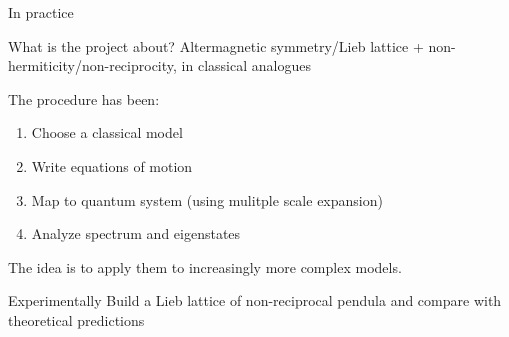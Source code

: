\documentclass[usepdftitle=false]{beamer}
\begin{document}
\begin{frame}{In practice}
    \begin{alertblock}{What is the project about?}
        Altermagnetic symmetry/Lieb lattice + non-hermiticity/non-reciprocity, in classical analogues
    \end{alertblock} \pause 
    The procedure has been:  
    \begin{enumerate}
        \item Choose a classical model   
        \item Write equations of motion   
        \item Map to quantum system (using mulitple scale expansion) 
        \item Analyze spectrum and eigenstates \pause 
    \end{enumerate}
    \vfill
    The idea is to apply them to increasingly more complex models.
    \vfill
    \begin{block}{Experimentally}
        Build a Lieb lattice of non-reciprocal pendula and compare with theoretical predictions
    \end{block}
\end{frame}
\end{document}
